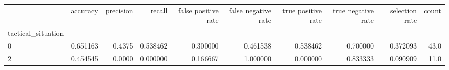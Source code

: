 \begin{tabular}{lrrrrrrrrr}
\toprule
{} &  accuracy &  precision &    recall &  false positive rate &  false negative rate &  true positive rate &  true negative rate &  selection rate &  count \\
tactical\_situation &           &            &           &                      &                      &                     &                     &                 &        \\
\midrule
0                  &  0.651163 &     0.4375 &  0.538462 &             0.300000 &             0.461538 &            0.538462 &            0.700000 &        0.372093 &   43.0 \\
2                  &  0.454545 &     0.0000 &  0.000000 &             0.166667 &             1.000000 &            0.000000 &            0.833333 &        0.090909 &   11.0 \\
\bottomrule
\end{tabular}

